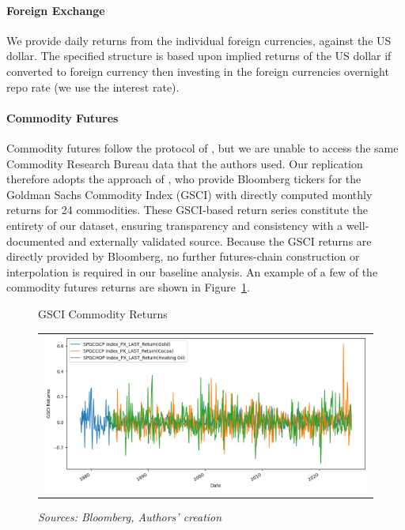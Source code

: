 \documentclass{article}
\begin{document}


\paragraph{Foreign Exchange}
We provide daily returns from the individual foreign currencies, against the US dollar. 
The specified structure is based upon implied returns of the US dollar if converted to foreign currency then investing 
in the foreign currencies overnight repo rate (we use the interest rate).


\paragraph{Commodity Futures}
Commodity futures follow the protocol of \cite{Yang2013}, but we are unable
to access the same Commodity Research Bureau data that the authors used. 
Our replication therefore adopts the approach of
\cite{Koijen2018}, who provide Bloomberg tickers for the Goldman Sachs
Commodity Index (GSCI) with directly computed monthly returns for 24 commodities.
These GSCI-based return series constitute the entirety of our dataset, ensuring
transparency and consistency with a well-documented and externally validated
source. Because the GSCI returns are directly provided by Bloomberg, no further
futures-chain construction or interpolation is required in our baseline analysis.
An example of a few of the commodity futures returns are shown in Figure~\ref{fig:gsci_commodity_returns}.

\begin{figure}[h]
    \centering
    \caption{GSCI Commodity Returns}
  \begin{tabular}{@{}c@{}}
    \includegraphics[width=.95\linewidth]{../docs_src/commod_gsci_return.png}
  \end{tabular}
  \caption*{\emph{Sources: Bloomberg, Authors' creation}}
  \label{fig:gsci_commodity_returns}
\end{figure}
\end{document}
